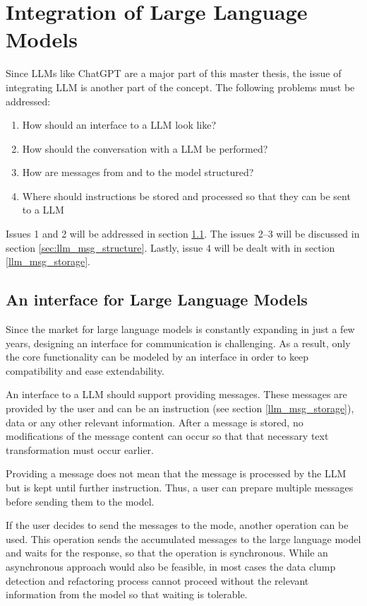 \section{Integration of Large Language Models}

Since \acp{LLM} like ChatGPT are a major part of this master thesis, the issue of integrating \ac{LLM} is another part of the concept. The following problems must be addressed:
\begin{enumerate}
    \item How should an interface to a \ac{LLM} look like?
    \item How should the conversation with a \ac{LLM} be performed?
    \item How are messages from and to the model structured?
    \item Where should instructions be stored and processed so that they can be sent to a \ac{LLM}
\end{enumerate}
Issues 1 and 2 will be addressed in section \ref{sec:llm_interface}. The issues 2--3 will be discussed in section \ref{sec:llm_msg_structure}. Lastly, issue 4 will be dealt with in section \ref{llm_msg_storage}.
\subsection{An interface for Large Language Models}\label{sec:llm_interface}

Since the market for large language models is constantly expanding in just a few years, designing an interface for communication is challenging. As a result, only the core functionality can be modeled by an interface in order to keep compatibility and ease extendability. 

An interface to a \ac{LLM} should support providing messages. These messages are provided by the user and can be an instruction (see  section \ref{llm_msg_storage}), data or any other relevant information. After a message is stored,  no modifications of the message content can occur so that that necessary text transformation must occur earlier. 

Providing a message does not mean that the message is processed by the \ac{LLM} but is kept until further instruction. Thus, a user can prepare multiple messages before sending them to the model.

If the user decides to send the messages to the mode, another operation can be used. This operation sends the accumulated messages to the large language model and waits for the response, so that the operation is synchronous. While an asynchronous approach would also be feasible, in most cases the data clump detection and refactoring process cannot proceed without the relevant information from the model so that waiting is tolerable. 

